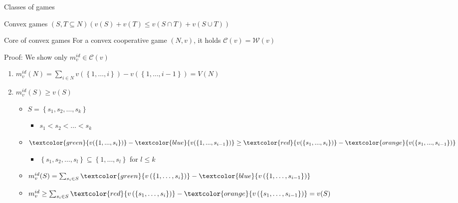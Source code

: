 \documentclass{beamer}
\begin{document}
\begin{frame}{Classes of games}
    \begin{block}{Convex games}
		$\left(S,T \subseteq N\right)\left(v(S)+v(T) \leq v\left(S \cap T\right)+v\left(S \cup T\right)\right)$
	\end{block}
	\pause
	\begin{block}{Core of convex games}
		\pause
		For a convex cooperative game $(N,v)$, it holds $\mathcal{C}(v)=\mathcal{W}(v)$
	\end{block}
	\pause
	Proof: We show only $m^{id}_v \in \mathcal{C}(v)$
	\begin{enumerate}
		\item<5-> $m^{id}_v(N)=\sum_{i \in N} v \left(\left\{1,\dots,i\right\}\right)-v \left(\left\{1,\dots,i-1\right\}\right)=V(N)$
		\item<6-> $m^{id}_v(S) \geq v(S)$
		\begin{itemize}
			\item<7-> $S=\left\{s_1,s_2,\dots,s_k\right\}$
			\begin{itemize}
				\item<7-> $s_1<s_2<\dots<s_k$
			\end{itemize}
			\item<8-> $\textcolor{green}{v (\left\{1,...,s_i\right\})}-\textcolor{blue}{v (\left\{1,...,s_{i-1}\right\})} \geq \textcolor{red}{v (\left\{s_1,...,s_i\right\})}-\textcolor{orange}{v (\left\{s_1,...,s_{i-1}\right\})}$
			\begin{itemize}
				\item<8-> $\left\{s_1,s_2,\dots,s_l\right\} \subseteq \left\{1,\dots,s_l\right\}$ for $l \leq k$
			\end{itemize}
			\item<9-> $m^{id}_v(S)=\sum_{s_i \in S} \textcolor{green}{v \left(\left\{1,\dots,s_i\right\}\right)} - \textcolor{blue}{v \left(\left\{1,\dots,s_{i-1}\right\}\right)}$
			\item<10-> $m^{id}_v \geq \sum_{s_i \in S} \textcolor{red}{v \left(\left\{s_1,\dots,s_i\right\}\right)}-\textcolor{orange}{v \left(\left\{s_1,\dots,s_{i-1}\right\}\right)}=v(S)$
		\end{itemize}
	\end{enumerate}
\end{frame}


\end{document}
